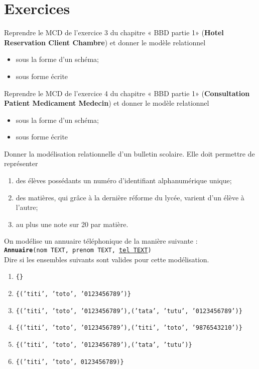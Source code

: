 \documentclass[10pt,firamath,cours]{nsi}
\begin{document}
\section{Exercices}

\begin{exercice}[]
	Reprendre le MCD de l'exercice 3 du chapitre « BBD partie 1» (\textbf{Hotel Reservation Client Chambre}) et donner le modèle relationnel
	\begin{itemize}
		\item	sous la forme d'un schéma;
		\item	sous forme écrite
	\end{itemize}
	\end{exercice}
	
	\begin{exercice}[]
	Reprendre le MCD de l'exercice 4 du chapitre « BBD partie 1» (\textbf{Consultation Patient Medicament Medecin}) et donner le modèle relationnel
	\begin{itemize}
		\item	sous la forme d'un schéma;
		\item	sous forme écrite
	\end{itemize}
	\end{exercice}
	
	\begin{exercice}[]
	Donner la modélisation relationnelle d'un bulletin scolaire. Elle doit permettre de représenter
	\begin{enumerate}
		\item 	des élèves possédants un numéro d'identifiant alphanumérique unique;
		\item 	des matières, qui grâce à la dernière réforme du lycée, varient d'un élève à l'autre;
		\item 	au plus une note sur 20 par matière.
	\end{enumerate}
	\end{exercice}
	
	\begin{exercice}[]
	On modélise un annuaire téléphonique de la manière suivante :\\
	
	\texttt{\textbf{Annuaire}(nom TEXT, prenom TEXT, \uline{tel TEXT})}\\
	
	Dire si les ensembles suivants sont valides pour cette modélisation.
	\begin{enumerate}
		\item 	\texttt{\{\}}
		\item 	\texttt{\{('titi', 'toto', '0123456789')\}}
		\item 	\texttt{\{('titi', 'toto', '0123456789'),('tata', 'tutu', '0123456789')\}}
		\item 	\texttt{\{('titi', 'toto', '0123456789'),('titi', 'toto', '9876543210')\}}
		\item 	\texttt{\{('titi', 'toto', '0123456789'),('tata', 'tutu')\}}
		\item 	\texttt{\{('titi', 'toto', 0123456789)\}}
	\end{enumerate}
	\end{exercice}
	
\end{document}
